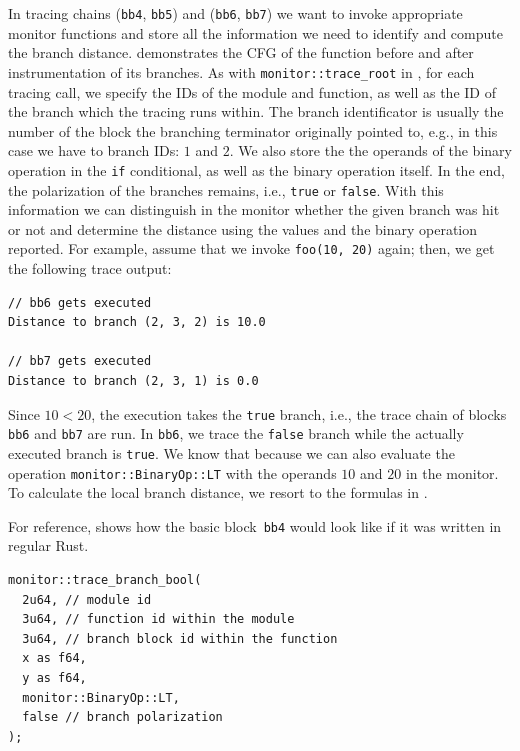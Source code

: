 \documentclass[paper=a4,%
  twoside,%
  BCOR4mm,%
  abstract=true,%
  toc=bibliography,%
  chapterprefix=true,%
  toc=bibliographynumbered,%
  open=right,%
  english,%
  pagesize=pdftex]{scrreprt}
\newcommand{\cfg}{\ac{CFG}\xspace}
\begin{document}
In tracing chains (\texttt{bb4}, \texttt{bb5}) and (\texttt{bb6}, \texttt{bb7}) we want to invoke appropriate monitor functions and store all the information we need to identify and compute the branch distance.  demonstrates the \cfg of the function before and after instrumentation of its branches. As with \texttt{monitor::trace\string_root} in , for each tracing call, we specify the IDs of the module and function, as well as the ID of the branch which the tracing runs within. The branch identificator is usually the number of the block the branching terminator originally pointed to, e.g., in this case we have to branch IDs: $1$ and $2$. We also store the the operands of the binary operation in the \texttt{if} conditional, as well as the binary operation itself. In the end, the polarization of the branches remains, i.e., \texttt{true} or \texttt{false}. With this information we can distinguish in the monitor whether the given branch was hit or not and determine the distance using the values and the binary operation reported. For example, assume that we invoke \texttt{foo(10, 20)} again; then, we get the following trace output:

\begin{lstlisting}[language={}, style=boxed, caption={}, label=lst:mir-instrument-branch-trace-output]
// bb6 gets executed
Distance to branch (2, 3, 2) is 10.0

// bb7 gets executed
Distance to branch (2, 3, 1) is 0.0
\end{lstlisting}

Since $10 < 20$, the execution takes the \texttt{true} branch, i.e., the trace chain of blocks \texttt{bb6} and \texttt{bb7} are run. In \texttt{bb6}, we trace the \texttt{false} branch while the actually executed branch is \texttt{true}. We know that because we can also evaluate the operation \texttt{monitor::BinaryOp::LT} with the operands $10$ and $20$ in the monitor. To calculate the local branch distance, we resort to the formulas in .

For reference,  shows how the basic block~\texttt{bb4} would look like if it was written in regular Rust.

\begin{lstlisting}[language={}, style=boxed, caption={How would \texttt{bb4} look like in regular Rust code}, label=lst:basic-block-in-regular-rust]
monitor::trace_branch_bool(
  2u64, // module id
  3u64, // function id within the module
  3u64, // branch block id within the function
  x as f64,
  y as f64,
  monitor::BinaryOp::LT,
  false // branch polarization
);
\end{lstlisting}
\end{document}
